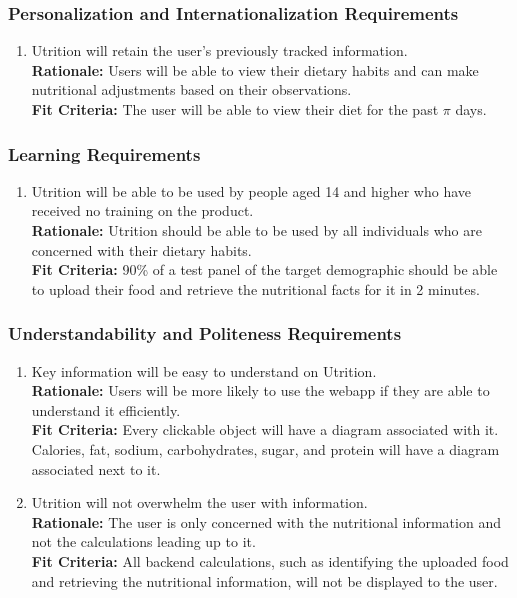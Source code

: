 \documentclass[12pt]{article}
\begin{document}
\subsubsection{Personalization and Internationalization Requirements}

\begin{enumerate}[{UH}2. ] 
	\item Utrition will retain the user’s previously tracked information.\\
	\textbf{Rationale:} Users will be able to view their dietary habits and can make nutritional adjustments based on their observations.\\
	\textbf{Fit Criteria:} The user will be able to view their diet for the past $\pi$ days.
	
\end{enumerate}

\subsubsection{Learning Requirements}

\begin{enumerate}[{UH}3. ] 
	\item Utrition will be able to be used by people aged 14 and higher who have received no training on the product.\\
	\textbf{Rationale:} Utrition should be able to be used by all individuals who are concerned with their dietary habits.\\
	\textbf{Fit Criteria:} 90\% of a test panel of the target demographic should be able to upload their food and retrieve the nutritional facts for it in 2 minutes.
\end{enumerate}

\subsubsection{Understandability and Politeness Requirements}

\begin{enumerate}[start=4,label={UH\arabic*.}]
	\item Key information will be easy to understand on Utrition.\\
	\textbf{Rationale:} Users will be more likely to use the webapp if they are able to understand it efficiently.\\
	\textbf{Fit Criteria:} Every clickable object will have a diagram associated with it. Calories, fat, sodium, carbohydrates, sugar, and protein will have a diagram associated next to it.
	\item Utrition will not overwhelm the user with information.\\
	\textbf{Rationale:} The user is only concerned with the nutritional information and not the calculations leading up to it.\\
	\textbf{Fit Criteria:} All backend calculations, such as identifying the uploaded food and retrieving the nutritional information, will not be displayed to the user.
\end{enumerate}
\end{document}
